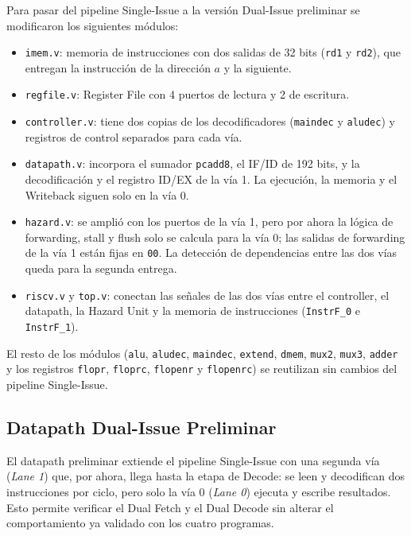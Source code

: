 \documentclass[12pt,a4paper]{article}
\begin{document}
Para pasar del pipeline Single-Issue a la versión Dual-Issue preliminar se modificaron los siguientes módulos:
\begin{itemize}
\item \texttt{imem.v}: memoria de instrucciones con dos salidas de 32 bits (\texttt{rd1} y \texttt{rd2}), que entregan la instrucción de la dirección $a$ y la siguiente.
\item \texttt{regfile.v}: Register File con 4 puertos de lectura y 2 de escritura.
\item \texttt{controller.v}: tiene dos copias de los decodificadores (\texttt{maindec} y \texttt{aludec}) y registros de control separados para cada vía.
\item \texttt{datapath.v}: incorpora el sumador \texttt{pcadd8}, el IF/ID de 192 bits, y la decodificación y el registro ID/EX de la vía 1. La ejecución, la memoria y el Writeback siguen solo en la vía 0.
\item \texttt{hazard.v}: se amplió con los puertos de la vía 1, pero por ahora la lógica de forwarding, stall y flush solo se calcula para la vía 0; las salidas de forwarding de la vía 1 están fijas en \texttt{00}. La detección de dependencias entre las dos vías queda para la segunda entrega.
\item \texttt{riscv.v} y \texttt{top.v}: conectan las señales de las dos vías entre el controller, el datapath, la Hazard Unit y la memoria de instrucciones (\texttt{InstrF\_0} e \texttt{InstrF\_1}).
\end{itemize}

El resto de los módulos (\texttt{alu}, \texttt{aludec}, \texttt{maindec}, \texttt{extend}, \texttt{dmem}, \texttt{mux2}, \texttt{mux3}, \texttt{adder} y los registros \texttt{flopr}, \texttt{floprc}, \texttt{flopenr} y \texttt{flopenrc}) se reutilizan sin cambios del pipeline Single-Issue.

\subsection{Datapath Dual-Issue Preliminar}

El datapath preliminar extiende el pipeline Single-Issue con una segunda vía (\textit{Lane 1}) que, por ahora, llega hasta la etapa de Decode: se leen y decodifican dos instrucciones por ciclo, pero solo la vía 0 (\textit{Lane 0}) ejecuta y escribe resultados. Esto permite verificar el Dual Fetch y el Dual Decode sin alterar el comportamiento ya validado con los cuatro programas.
\end{document}
